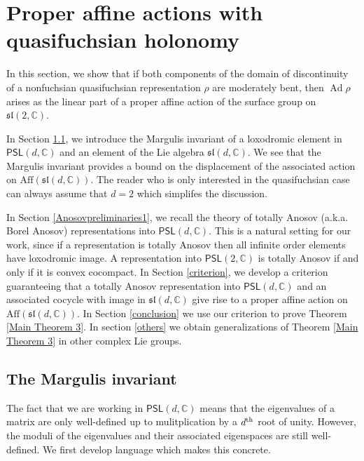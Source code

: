 \documentclass{amsart}
\theoremstyle{plain}
\theoremstyle{definition}
\theoremstyle{remark}
\newcommand{\Ad}{\operatorname{Ad}}
\newcommand{\PSL}{\mathsf{PSL}}
\newcommand{\<}{\left <}
\renewcommand{\>}{\right >}
\begin{document}
\section{Proper affine actions  with quasifuchsian holonomy}
\label{affine actions}

In this section, we show that if both components of the domain of discontinuity of  a nonfuchsian quasifuchsian
representation $\rho$ are moderately bent, then $\Ad\rho$
arises as the linear part of a proper affine action of the surface group on $\mathfrak{sl}(2,\mathbb C)$.

In Section \ref{margulis}, we introduce the Margulis invariant of a loxodromic element in $\mathsf{PSL}(d,\mathbb C)$ and an element of
the Lie algebra $\mathfrak{sl}(d,\mathbb C)$. We see that the Margulis invariant provides a bound on the displacement of the associated action
on $\mathrm{Aff}(\mathfrak{sl}(d,\mathbb C))$.
The reader who is only interested in the quasifuchsian case can always assume that $d=2$
which simplifes the discussion. 

In Section \ref{Anosovpreliminaries1}, we recall the theory of totally Anosov (a.k.a. Borel Anosov) representations into $\mathsf{PSL}(d,\mathbb C)$.
This is a natural setting for  our work, since  if a representation is totally Anosov then all infinite order elements have loxodromic image.
A representation into $\mathsf{PSL}(2,\mathbb C)$ is totally Anosov if and only if it is convex cocompact.
In Section \ref{criterion}, we develop a criterion guaranteeing that a totally Anosov representation into $\mathsf{PSL}(d,\mathbb C)$ and an associated cocycle with image in
$\mathfrak{sl}(d,\mathbb C)$ give rise to a proper affine action on $\mathrm{Aff}(\mathfrak{sl}(d,\mathbb C))$.
In Section \ref{conclusion} we use our criterion to prove  Theorem \ref{Main Theorem 3}. In section \ref{others}
we obtain generalizations of Theorem \ref{Main Theorem 3} in other complex Lie groups.




\subsection{The Margulis invariant}
\label{margulis}

The fact that we are working in $\PSL(d,\mathbb C)$ means that the eigenvalues of a matrix are only well-defined up to mulitplication by a $d^{\rm th}$ root of unity.
However, the moduli of the eigenvalues and their associated eigenspaces are still well-defined. We first develop language which makes this concrete.
\end{document}
